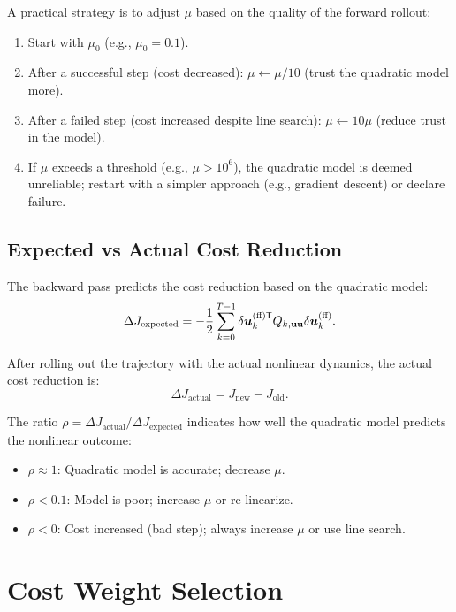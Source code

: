 A practical strategy is to adjust $\mu$ based on the quality of the forward rollout:
\begin{enumerate}
\item Start with $\mu_0$ (e.g., $\mu_0 = 0.1$).
\item After a successful step (cost decreased): $\mu \gets \mu / 10$ (trust the quadratic model more).
\item After a failed step (cost increased despite line search): $\mu \gets 10\mu$ (reduce trust in the model).
\item If $\mu$ exceeds a threshold (e.g., $\mu > 10^6$), the quadratic model is deemed unreliable; restart
      with a simpler approach (e.g., gradient descent) or declare failure.
\end{enumerate}

\subsection{Expected vs Actual Cost Reduction}

The backward pass predicts the cost reduction based on the quadratic model:
\begin{equation}
\Delta J_{\text{expected}} = -\frac{1}{2}\sum_{k=0}^{T-1} \delta\bm{u}_k^{(\text{ff})\mathsf{T}}Q_{k,\mathbf{u}\mathbf{u}}\delta\bm{u}_k^{(\text{ff})}.
\label{eq:ch5:expected-reduction}
\end{equation}

After rolling out the trajectory with the actual nonlinear dynamics, the actual cost reduction is:
\begin{equation}
\Delta J_{\text{actual}} = J_{\text{new}} - J_{\text{old}}.
\label{eq:ch5:actual-reduction}
\end{equation}

The ratio $\rho = \Delta J_{\text{actual}} / \Delta J_{\text{expected}}$ indicates how well the quadratic model
predicts the nonlinear outcome:
\begin{itemize}
\item $\rho \approx 1$: Quadratic model is accurate; decrease $\mu$.
\item $\rho < 0.1$: Model is poor; increase $\mu$ or re-linearize.
\item $\rho < 0$: Cost increased (bad step); always increase $\mu$ or use line search.
\end{itemize}

\section{Cost Weight Selection}

